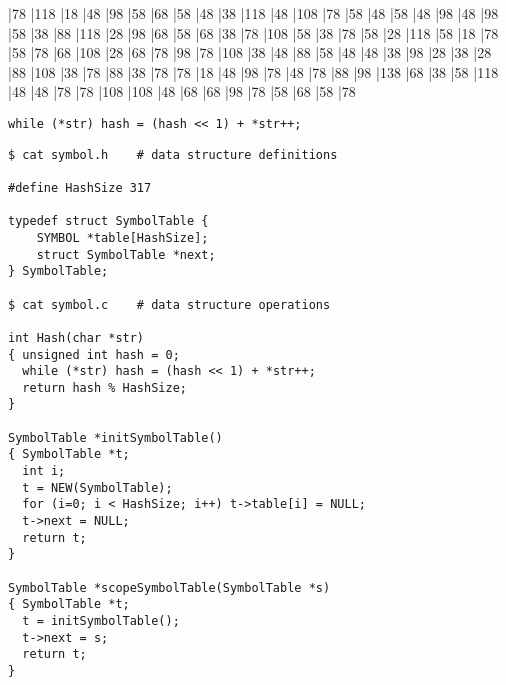 \begin{slide*}
\begin{barenv}
\bar{7}{8}
\bar{11}{8}
\bar{1}{8}
\bar{4}{8}
\bar{9}{8}
\bar{5}{8}
\bar{6}{8}
\bar{5}{8}
\bar{4}{8}
\bar{3}{8}
\bar{11}{8}
\bar{4}{8}
\bar{10}{8}
\bar{7}{8}
\bar{5}{8}
\bar{4}{8}
\bar{5}{8}
\bar{4}{8}
\bar{9}{8}
\bar{4}{8}
\bar{9}{8}
\bar{5}{8}
\bar{3}{8}
\bar{8}{8}
\bar{11}{8}
\bar{2}{8}
\bar{9}{8}
\bar{6}{8}
\bar{5}{8}
\bar{6}{8}
\bar{3}{8}
\bar{7}{8}
\bar{10}{8}
\bar{5}{8}
\bar{3}{8}
\bar{7}{8}
\bar{5}{8}
\bar{2}{8}
\bar{11}{8}
\bar{5}{8}
\bar{1}{8}
\bar{7}{8}
\bar{5}{8}
\bar{7}{8}
\bar{6}{8}
\bar{10}{8}
\bar{2}{8}
\bar{6}{8}
\bar{7}{8}
\bar{9}{8}
\bar{7}{8}
\bar{10}{8}
\bar{3}{8}
\bar{4}{8}
\bar{8}{8}
\bar{5}{8}
\bar{4}{8}
\bar{4}{8}
\bar{3}{8}
\bar{9}{8}
\bar{2}{8}
\bar{3}{8}
\bar{2}{8}
\bar{8}{8}
\bar{10}{8}
\bar{3}{8}
\bar{7}{8}
\bar{8}{8}
\bar{3}{8}
\bar{7}{8}
\bar{7}{8}
\bar{1}{8}
\bar{4}{8}
\bar{9}{8}
\bar{7}{8}
\bar{4}{8}
\bar{7}{8}
\bar{8}{8}
\bar{9}{8}
\bar{13}{8}
\bar{6}{8}
\bar{3}{8}
\bar{5}{8}
\bar{11}{8}
\bar{4}{8}
\bar{4}{8}
\bar{7}{8}
\bar{7}{8}
\bar{10}{8}
\bar{10}{8}
\bar{4}{8}
\bar{6}{8}
\bar{6}{8}
\bar{9}{8}
\bar{7}{8}
\bar{5}{8}
\bar{6}{8}
\bar{5}{8}
\bar{7}{8}
\end{barenv}
\mbox{}\hfil{\scriptsize \verb"while (*str) hash = (hash << 1) + *str++;"}\hfil
\vfil
\end{slide*}

\begin{slide*}
\begin{scriptsize}
\begin{verbatim}
$ cat symbol.h    # data structure definitions

#define HashSize 317
 
typedef struct SymbolTable {
    SYMBOL *table[HashSize];
    struct SymbolTable *next;
} SymbolTable;

$ cat symbol.c    # data structure operations

int Hash(char *str)
{ unsigned int hash = 0;
  while (*str) hash = (hash << 1) + *str++; 
  return hash % HashSize;
}

SymbolTable *initSymbolTable()
{ SymbolTable *t;
  int i;
  t = NEW(SymbolTable);
  for (i=0; i < HashSize; i++) t->table[i] = NULL;
  t->next = NULL;
  return t;
}
 
SymbolTable *scopeSymbolTable(SymbolTable *s)
{ SymbolTable *t;
  t = initSymbolTable();
  t->next = s;
  return t;
}
\end{verbatim}
\end{scriptsize}
\vfil
\end{slide*}
 
